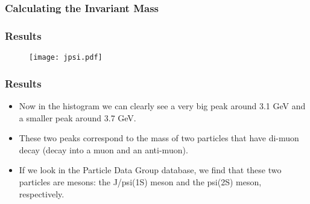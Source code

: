 \documentclass[8pt]{beamer}
\begin{document}
\begin{frame}
\frametitle{Calculating the Invariant Mass}
\end{frame}

\begin{frame}
\frametitle{Results}
\begin{figure}[ht!]
\texttt{[image: jpsi.pdf]}
\end{figure}
\end{frame}

\begin{frame}
\frametitle{Results}
\begin{itemize}
\item Now in the histogram we can clearly see a very big peak around 3.1 GeV and a 
smaller peak around 3.7 GeV.\\[0.5cm]
\item These two peaks correspond to the mass of two particles that have di-muon decay
(decay into a muon and an anti-muon).\\[0.5cm]
\item If we look in the Particle Data Group database, we find that these two particles
are mesons: the J/psi(1S) meson and the psi(2S) meson, respectively.
\end{itemize}
\end{frame}

 
\end{document}
